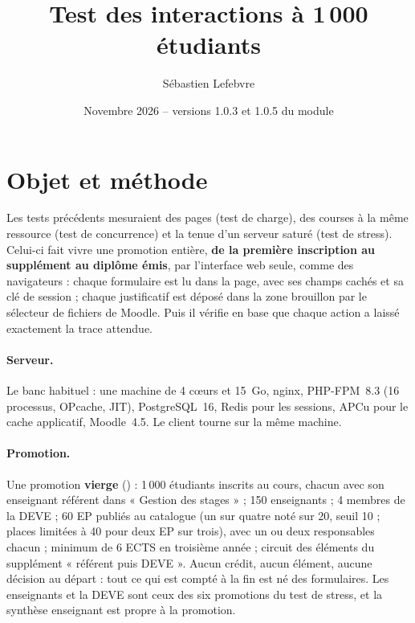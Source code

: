 \documentclass[11pt,a4paper]{article}
\title{Test des interactions à 1\,000 étudiants}
\author{Sébastien Lefebvre}
\date{Novembre 2026 -- versions 1.0.3 et 1.0.5 du module}
\newcommand{\code}[1]{\texttt{\detokenize{#1}}}
\begin{document}
\maketitle

\section{Objet et méthode}

Les tests précédents mesuraient des pages (test de charge), des courses à la même ressource
(test de concurrence) et la tenue d'un serveur saturé (test de stress). Celui-ci fait vivre une
promotion entière, \textbf{de la première inscription au supplément au diplôme émis}, par
l'interface web seule, comme des navigateurs : chaque formulaire est lu dans la page, avec ses
champs cachés et sa clé de session ; chaque justificatif est déposé dans la zone brouillon par
le sélecteur de fichiers de Moodle. Puis il vérifie en base que chaque action a laissé exactement
la trace attendue.

\paragraph{Serveur.} Le banc habituel : une machine de 4 c\oe urs et 15~Go, nginx, PHP-FPM~8.3
(16 processus, OPcache, JIT), PostgreSQL~16, Redis pour les sessions, APCu pour le cache
applicatif, Moodle~4.5. Le client tourne sur la même machine.

\paragraph{Promotion.} Une promotion \textbf{vierge} (\code{VIERGE=1 charge_setup.php}) :
1\,000 étudiants inscrits au cours, chacun avec son enseignant référent dans « Gestion des
stages » ; 150 enseignants ; 4 membres de la DEVE ; 60 EP publiés au catalogue (un sur quatre noté
sur 20, seuil 10 ; places limitées à 40 pour deux EP sur trois), avec un ou deux responsables
chacun ; minimum de 6 ECTS en troisième année ; circuit des éléments du supplément
« référent puis DEVE ». Aucun crédit, aucun élément, aucune décision au départ : tout ce qui est
compté à la fin est né des formulaires. Les enseignants et la DEVE sont ceux des six promotions du
test de stress, et la synthèse enseignant est propre à la promotion.
\end{document}
